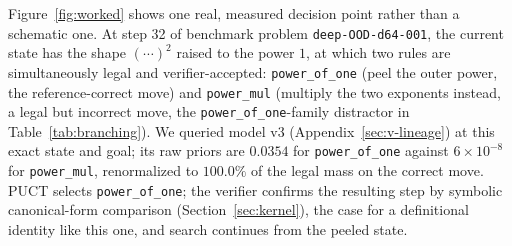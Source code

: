 \documentclass[11pt]{article}
\numberwithin{equation}{section}
\begin{document}
Figure~\ref{fig:worked} shows one real, measured decision point rather than a schematic one. At step 32 of benchmark problem \texttt{deep-OOD-d64-001}, the current state has the shape $(\cdots)^2$ raised to the power $1$, at which two rules are simultaneously legal and verifier-accepted: \texttt{power\_of\_one} (peel the outer power, the reference-correct move) and \texttt{power\_mul} (multiply the two exponents instead, a legal but incorrect move, the \texttt{power\_of\_one}-family distractor in Table~\ref{tab:branching}). We queried model v3 (Appendix~\ref{sec:v-lineage}) at this exact state and goal; its raw priors are $0.0354$ for \texttt{power\_of\_one} against $6\times10^{-8}$ for \texttt{power\_mul}, renormalized to $100.0\%$ of the legal mass on the correct move. PUCT selects \texttt{power\_of\_one}; the verifier confirms the resulting step by symbolic canonical-form comparison (Section~\ref{sec:kernel}), the case for a definitional identity like this one, and search continues from the peeled state.
\end{document}
